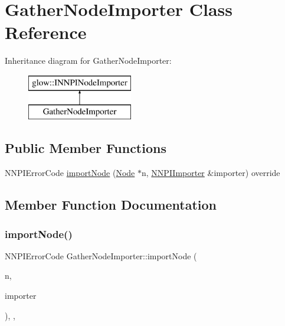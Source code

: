 \hypertarget{class_gather_node_importer}{}\section{Gather\+Node\+Importer Class Reference}
\label{class_gather_node_importer}
Inheritance diagram for Gather\+Node\+Importer\+:\begin{figure}[H]
\begin{center}
\leavevmode
\includegraphics[height=2.000000cm]{class_gather_node_importer}
\end{center}
\end{figure}
\subsection*{Public Member Functions}
\begin{DoxyCompactItemize}
\item 
N\+N\+P\+I\+Error\+Code \hyperlink{class_gather_node_importer_a16e8011ab8f80579760db82d0c5ea291}{import\+Node} (\hyperlink{classglow_1_1_node}{Node} $\ast$n, \hyperlink{classglow_1_1_n_n_p_i_importer}{N\+N\+P\+I\+Importer} \&importer) override
\end{DoxyCompactItemize}


\subsection{Member Function Documentation}
\mbox{\label{class_gather_node_importer_a16e8011ab8f80579760db82d0c5ea291}} 
\subsubsection{\texorpdfstring{import\+Node()}{importNode()}}
{\footnotesize\ttfamily N\+N\+P\+I\+Error\+Code Gather\+Node\+Importer\+::import\+Node (\begin{DoxyParamCaption}\item[{\hyperlink{classglow_1_1_node}{Node} $\ast$}]{n,  }\item[{\hyperlink{classglow_1_1_n_n_p_i_importer}{N\+N\+P\+I\+Importer} \&}]{importer }\end{DoxyParamCaption})\hspace{0.3cm}{\ttfamily [inline]}, {\ttfamily [override]}, {\ttfamily [virtual]}}

